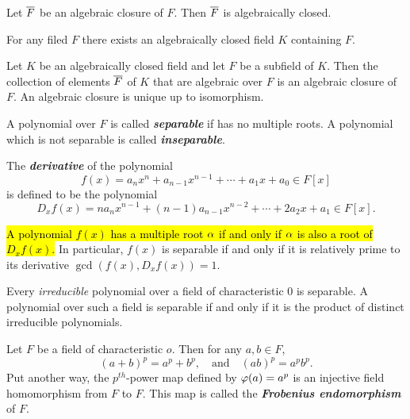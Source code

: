 \nl

\begin{prop}
Let $\overline F$ be an algebraic closure of $F$. Then $\overline F$ is algebraically closed.
\end{prop}

\nl

\begin{prop}
For any filed $F$ there exists an algebraically closed field $K$ containing $F$.
\end{prop}

\nl

\begin{prop}
Let $K$ be an algebraically closed field and let $F$ be a subfield of $K$. Then the collection of elements $\overline F$ of $K$ that are algebraic over $F$ is an algebraic closure of $F$. An algebraic closure is unique up to isomorphism.
\end{prop}

\nl

\begin{defn}
A polynomial over $F$ is called \textit{\textbf{separable}} if has no multiple roots. A polynomial which is not separable is called \textit{\textbf{inseparable}}.
\end{defn}

\nl

\begin{defn}
The \textit{\textbf{derivative}} of the polynomial
\[f(x) = a_nx^n + a_{n - 1}x^{n - 1} + \cdots + a_1x + a_0\in F[x]\]
is defined to be the polynomial
\[D_xf(x) = na_n x^{n - 1} + (n - 1)a_{n - 1}x^{n - 2} + \cdots + 2a_2x + a_1 \in F[x].\]
\end{defn}

\nl

\begin{prop}
\hl{A polynomial $f(x)$ has a multiple root $\alpha$ if and only if $\alpha$ is also a root of $D_xf(x)$.} In particular, $f(x)$ is separable if and only if it is relatively prime to its derivative $\gcd(f(x), D_xf(x)) = 1$.
\end{prop}

\nl

\begin{cor}
Every \textit{irreducible} polynomial over a field of characteristic 0 is separable. A polynomial over such a field is separable if and only if it is the product of distinct irreducible polynomials.
\end{cor}

\nl

\begin{prop}
Let $F$ be a field of characteristic $o$. Then for any $a,b\in F$,
\[(a + b)^p = a^p + b^p,\quad\text{and}\quad(ab)^p = a^pb^p.\]
Put another way, the $p^{th}$-power map defined by $\varphi(a) = a^p$ is an injective field homomorphism from $F$ to $F$. This map is called the \textit{\textbf{Frobenius endomorphism}} of $F$.
\end{prop}

